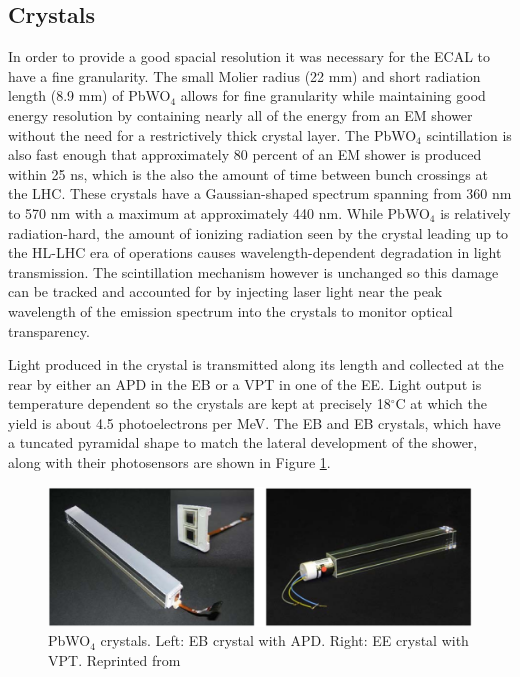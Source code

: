 \subsection{Crystals}
In order to provide a good spacial resolution it was necessary for the ECAL to have a fine granularity. The small Molier radius (22 mm) and short radiation length (8.9 mm) of PbWO$_{4}$ allows for fine granularity while maintaining good energy resolution by containing nearly all of the energy from an EM shower without the need for a restrictively thick crystal layer.  The PbWO$_{4}$ scintillation is also fast enough that approximately 80 percent of an EM shower is produced within 25 ns, which is the also the amount of time between bunch crossings at the LHC.  These crystals have a Gaussian-shaped spectrum spanning from 360 nm to 570 nm with a maximum at approximately 440 nm.  While PbWO$_{4}$ is relatively radiation-hard, the amount of ionizing radiation seen by the crystal leading up to the HL-LHC era of operations causes wavelength-dependent degradation in light transmission.  The scintillation mechanism however is unchanged so this damage can be tracked and accounted for by injecting laser light near the peak wavelength of the emission spectrum into the crystals to monitor optical transparency.

Light produced in the crystal is transmitted along its length and collected at the rear by either an APD in the EB or a VPT in one of the EE.  Light output is temperature dependent so the crystals are kept at precisely 18$^{\circ}$C at which the yield is about 4.5 photoelectrons per MeV.  The EB and EB crystals, which have a tuncated pyramidal shape to match the lateral development of the shower, along with their photosensors are shown in Figure \ref{fig:ecalcrystals}.  

\begin{figure}[h]
	\centering
	\includegraphics[width=1.0\linewidth]{Figures/ECAL_crystals}
	\caption{PbWO$_{4}$ crystals. Left: EB crystal with APD. Right: EE crystal with VPT.  Reprinted from \cite{Collaboration_2008}}
	\label{fig:ecalcrystals}
\end{figure}



